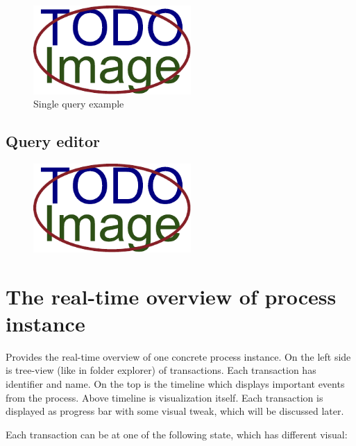       \begin{figure}[ht!]
          \centering
          \includegraphics[width=6cm,keepaspectratio]{img/TODO-image}
          \caption{Single query example}
           \label{fig:widget-single-query}
      \end{figure}       
    
    \subsection{Query editor}
    
    
    \begin{figure}[ht!]
          \centering
          \includegraphics[width=6cm,keepaspectratio]{img/TODO-image}
          \caption{}
      \end{figure}   
    
    \section{The real-time overview of process instance}
    Provides the real-time overview of one concrete process instance.
On the left side is tree-view (like in folder explorer) of transactions. Each transaction has identifier and name.
On the top is the timeline which displays important events from the process. Above timeline is visualization itself. Each transaction is displayed as progress bar with some visual tweak, which will be discussed later.

	Each transaction can be at one of the following state, which has different visual: 
    
